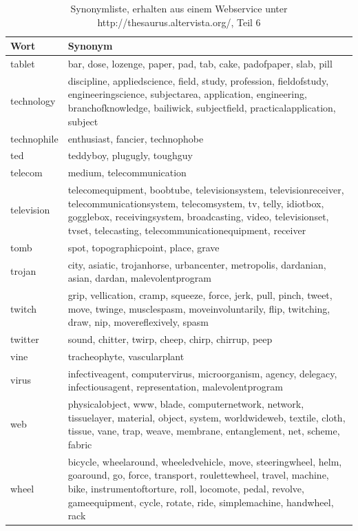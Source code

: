 \documentclass[12pt,a4paper]{report}
\begin{document}
	\begin{table}[H]
\caption{Synonymliste, erhalten aus einem Webservice unter http://thesaurus.altervista.org/, Teil 6 }
\begin{center}
\begin{tabular}{ |l|p{14cm}|}
\hline
\textbf{Wort} & \textbf{Synonym}\\
\hline

tablet & bar, dose, lozenge, paper, pad, tab, cake, padofpaper, slab, pill\\
\hline
technology & discipline, appliedscience, field, study, profession, fieldofstudy, engineeringscience, subjectarea, application, engineering, branchofknowledge, bailiwick, subjectfield, practicalapplication, subject\\
\hline
technophile & enthusiast, fancier, technophobe\\
\hline
ted & teddyboy, plugugly, toughguy\\
\hline
telecom & medium, telecommunication\\
\hline
television & telecomequipment, boobtube, televisionsystem, televisionreceiver, telecommunicationsystem, telecomsystem, tv, telly, idiotbox, gogglebox, receivingsystem, broadcasting, video, televisionset, tvset, telecasting, telecommunicationequipment, receiver\\
\hline
tomb & spot, topographicpoint, place, grave\\
\hline
trojan & city, asiatic, trojanhorse, urbancenter, metropolis, dardanian, asian, dardan, malevolentprogram\\
\hline
twitch & grip, vellication, cramp, squeeze, force, jerk, pull, pinch, tweet, move, twinge, musclespasm, moveinvoluntarily, flip, twitching, draw, nip, movereflexively, spasm\\
\hline
twitter & sound, chitter, twirp, cheep, chirp, chirrup, peep\\
\hline
vine & tracheophyte, vascularplant\\
\hline
virus & infectiveagent, computervirus, microorganism, agency, delegacy, infectiousagent, representation, malevolentprogram\\
\hline
web & physicalobject, www, blade, computernetwork, network, tissuelayer, material, object, system, worldwideweb, textile, cloth, tissue, vane, trap, weave, membrane, entanglement, net, scheme, fabric\\
\hline
wheel & bicycle, wheelaround, wheeledvehicle, move, steeringwheel, helm, goaround, go, force, transport, roulettewheel, travel, machine, bike, instrumentoftorture, roll, locomote, pedal, revolve, gameequipment, cycle, rotate, ride, simplemachine, handwheel, rack\\

\end{tabular}
\end{center}
\end{table}
\end{document}

